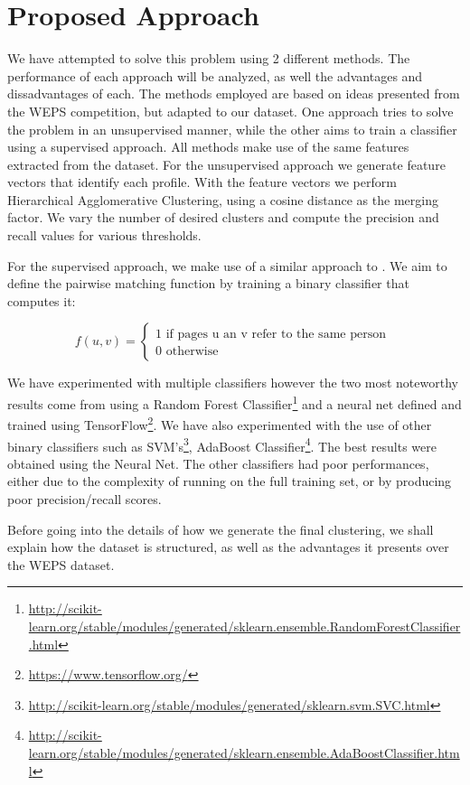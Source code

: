 \chapter{Proposed Approach}
\label{chapter:proposed-approach}
We have attempted to solve this problem using 2 different methods. The performance
of each approach will be analyzed, as well the advantages and dissadvantages of
each. The methods employed are based on ideas presented from the WEPS competition,
but adapted to our dataset. One approach tries to solve the problem in an unsupervised
manner, while the other aims to train a classifier using a supervised
approach. All methods make use of the same features extracted from the dataset.
For the unsupervised approach we generate feature vectors that identify each
profile. With the feature vectors we perform Hierarchical Agglomerative Clustering,
using a cosine distance as the merging factor. We vary the number of desired
clusters and compute the precision and recall values for various thresholds.

For the supervised approach, we make use of a similar approach to
\cite{connection-analysis}. We aim to define the pairwise matching function by
training a binary classifier that computes it:

\[ f(u, v) =
    \left\{
        \begin{array}{ll}
            1 \mbox{ if pages u an v refer to the same person } \\
            0 \mbox{ otherwise }
        \end{array}
    \right.
\]

We have experimented with multiple classifiers however the two most noteworthy
results come from using a Random Forest Classifier\footnote{\url{http://scikit-learn.org/stable/modules/generated/sklearn.ensemble.RandomForestClassifier.html}}
and a neural net defined and trained using TensorFlow\footnote{\url{https://www.tensorflow.org/}}.
We have also experimented with the use of other binary classifiers such as SVM's\footnote{\url{http://scikit-learn.org/stable/modules/generated/sklearn.svm.SVC.html}},
AdaBoost Classifier\footnote{\url{http://scikit-learn.org/stable/modules/generated/sklearn.ensemble.AdaBoostClassifier.html}}.
The best results were obtained using the Neural Net. The other classifiers
had poor performances, either due to the complexity of running on the full training set,
or by producing poor precision/recall scores.

Before going into the details of how we generate the final clustering, we shall
explain how the dataset is structured, as well as the advantages it presents
over the WEPS dataset.

